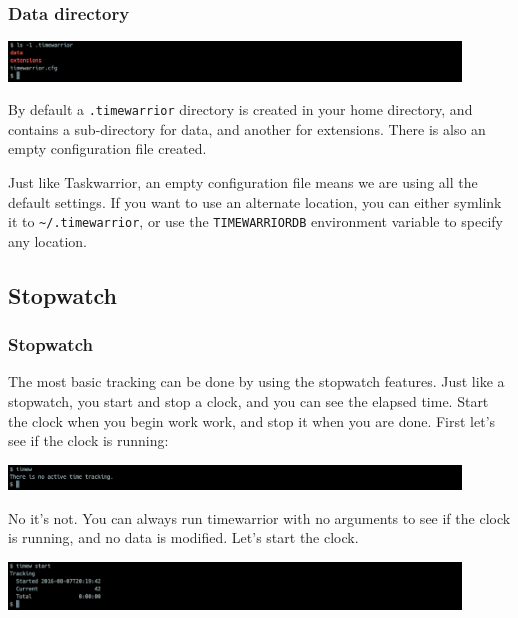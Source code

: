 \documentclass[t,handout]{beamer}
\begin{document}
\begin{frame}[fragile]\frametitle{Data directory}
    \includegraphics[width=12cm]{images/tutorial2.png}

    By default a \verb=.timewarrior= directory is created in your home directory, and contains a sub-directory for data, and another for extensions. There is also an empty configuration file created.

    Just like Taskwarrior, an empty configuration file means we are using all the default settings. If you want to use an alternate location, you can either symlink it to \verb=~/.timewarrior=, or use the \verb=TIMEWARRIORDB= environment variable to specify any location.
\end{frame}

\subsection{Stopwatch}

\begin{frame}[fragile]\frametitle{Stopwatch}
    The most basic tracking can be done by using the stopwatch features. Just like a stopwatch, you start and stop a clock, and you can see the elapsed time. Start the clock when you begin work work, and stop it when you are done. First let's see if the clock is running:

    \includegraphics[width=12cm]{images/tutorial3.png}

    No it's not. You can always run timewarrior with no arguments to see if the clock is running, and no data is modified. Let's start the clock.

    \includegraphics[width=12cm]{images/tutorial4.png}
\end{frame}
\end{document}
